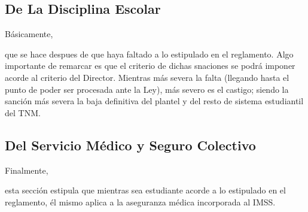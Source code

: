 \documentclass[stu, 12pt, letterpaper, donotrepeattitle, floatsintext, natbib]{apa7}
\begin{document}
\subsection{De La Disciplina Escolar}
Básicamente, \begin{justifying}
    que se hace despues de que haya faltado a lo estipulado en el reglamento. Algo importante de remarcar es que el criterio de dichas snaciones se podrá imponer acorde al criterio del Director. Mientras más severa la falta (llegando hasta el punto de poder ser 
procesada ante la Ley), más severo es el castigo; siendo la sanción más severa la baja definitiva del plantel y del resto de sistema estudiantil del TNM.\par
\end{justifying}
\vspace{\baselineskip}
\subsection{Del Servicio Médico y Seguro Colectivo}
Finalmente, \begin{justifying}
    esta sección estipula que mientras sea estudiante acorde a lo estipulado en el reglamento, él mismo aplica a la aseguranza médica incorporada al IMSS.\par
\end{justifying}

\newpage
\setcounter{secnumdepth}{0} %
\renewcommand\refname{\textbf{Referencias}}

\end{document}
